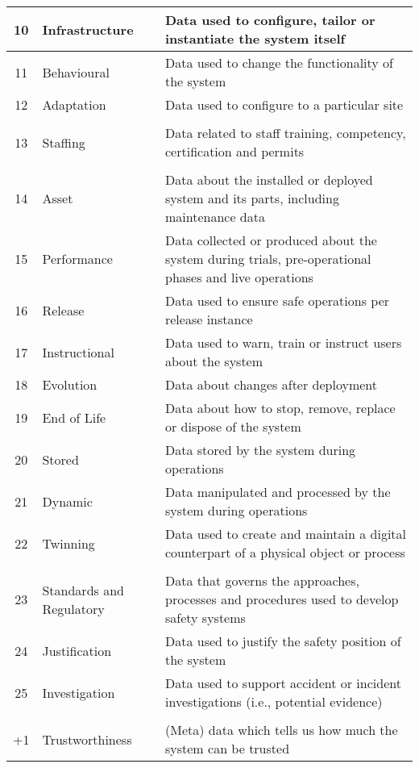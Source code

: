 \begin{longtable}{|C{}|L{}|L{}|}
  {10} & {Infrastructure} & {Data used to configure, tailor or instantiate the system itself}\\\hline
  {11} & {Behavioural} & {Data used to change the functionality of the system}\\\hline
  {12} & {Adaptation} & {Data used to configure to a particular site}\\\hline
  \\\hline
  {13} & {Staffing} & {Data related to staff training, competency, certification and permits}\\\hline
  \\\hline
  {14} & {Asset} & {Data about the installed or deployed system and its parts, including maintenance data}\\\hline
  {15} & {Performance} & {Data collected or produced about the system during trials, pre-operational phases and live operations}\\\hline
  {16} & {Release} & {Data used to ensure safe operations per release instance}\\\hline
  {17} & {Instructional} & {Data used to warn, train or instruct users about the system}\\\hline
  {18} & {Evolution} & {Data about changes after deployment}\\\hline
  {19} & {End of Life} & {Data about how to stop, remove, replace or dispose of the system}\\\hline
  {20} & {Stored} & {Data stored by the system during operations}\\\hline
  {21} & {Dynamic} & {Data manipulated and processed by the system during operations}\\\hline
  {22} & {Twinning} & {Data used to create and maintain a digital counterpart of a physical object or process}\\\hline
%
  \\\hline
  {23} & {Standards and Regulatory} & {Data that governs the approaches,  processes and procedures used to develop safety systems}\\\hline
  {24} & {Justification} & {Data used to justify the safety position of the system}\\\hline
  {25} & {Investigation} & {Data used to support accident or incident investigations (i.e., potential evidence)}\\\hline
  \\\hline
  {+1} & {Trustworthiness} & {(Meta) data which tells us how much the system can be trusted}\\\hline
\end{longtable}

